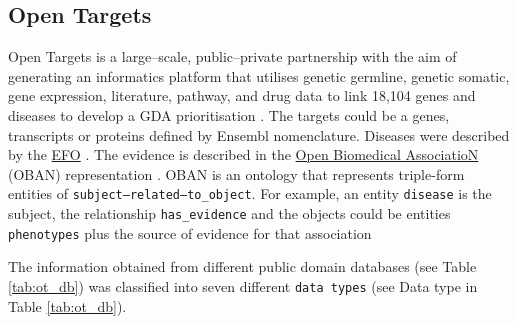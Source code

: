 \subsection{Open Targets}
\label{subsec:ot}

Open Targets is a large--scale, public--private partnership with the aim of generating an informatics platform that utilises genetic germline, genetic somatic, gene expression, literature, pathway, and drug data to link 18,104 genes and diseases to develop a GDA prioritisation \cite{ferrero2017}. The targets could be a genes, transcripts or proteins defined by Ensembl nomenclature. Diseases were described by the \href{https://goo.gl/YvvC8D}{EFO} \cite{experimentalFactorOntology2010}. The evidence is described in the \href{https://goo.gl/CNqAqt}{Open Biomedical AssociatioN} (OBAN) representation \cite{sarntivijai2016}. OBAN is an ontology that represents triple-form entities of \texttt{subject--related--to\_object}. For example, an entity \texttt{disease} is the subject, the relationship \texttt{has\_evidence} and the objects could be entities \texttt{phenotypes} plus the source of evidence for that association

The information obtained from different public domain databases (see Table \ref{tab:ot_db}) was classified into seven different \texttt{data types} (see Data type in Table \ref{tab:ot_db}).

